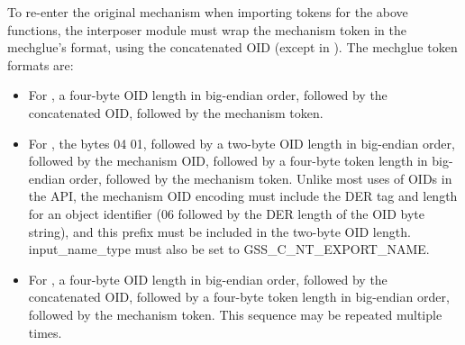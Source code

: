 \documentclass[letterpaper,10pt,english]{sphinxmanual}
\begin{document}
%
\begin{sphinxVerbatim}[commandchars=\\\{\}]
  
       
     

  
       
       

  
       
     
\end{sphinxVerbatim}

To re-enter the original mechanism when importing tokens for the above
functions, the interposer module must wrap the mechanism token in the
mechglue’s format, using the concatenated OID (except in
).  The mechglue token formats are:
\begin{itemize}
\item {} 
For , a four-byte OID length in big-endian
order, followed by the concatenated OID, followed by the mechanism
token.

\item {} 
For , the bytes 04 01, followed by a two-byte OID
length in big-endian order, followed by the mechanism OID, followed
by a four-byte token length in big-endian order, followed by the
mechanism token.  Unlike most uses of OIDs in the API, the mechanism
OID encoding must include the DER tag and length for an object
identifier (06 followed by the DER length of the OID byte string),
and this prefix must be included in the two-byte OID length.
input\_name\_type must also be set to GSS\_C\_NT\_EXPORT\_NAME.

\item {} 
For , a four-byte OID length in big-endian order,
followed by the concatenated OID, followed by a four-byte token
length in big-endian order, followed by the mechanism token.  This
sequence may be repeated multiple times.

\end{itemize}
\end{document}
